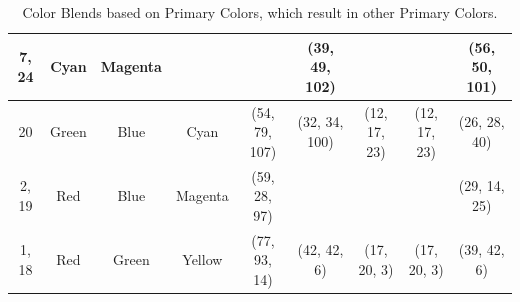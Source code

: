 \begin{table}[htbp]
{\begin{tabular}{ccccclclclclcl}
    \multicolumn{1}{c|}{7, 24}    & \multicolumn{1}{c|}{Cyan}    & \multicolumn{1}{c||}{Magenta} & \multicolumn{1}{c||}{\cellcolor[HTML]{0000FF}{\color[HTML]{FFFFFF} Blue}} & \multicolumn{2}{c||}{\cellcolor[HTML]{0000FF}{\color[HTML]{FFFFFF} (18, 7, 95)}} & \multicolumn{2}{c||}{\cellcolor[HTML]{00CAFF}(39, 49, 102)}                       & \multicolumn{2}{c||}{\cellcolor[HTML]{8080FF}{\color[HTML]{FFFFFF} (35, 27, 98)}} & \multicolumn{2}{c||}{\cellcolor[HTML]{8080FF}{\color[HTML]{FFFFFF} (35, 27, 98)}} & \multicolumn{2}{c|}{\cellcolor[HTML]{C6AEFF}(56, 50, 101)} \\ \hline \hline
    \multicolumn{1}{c|}{20}       & \multicolumn{1}{c|}{Green}   & \multicolumn{1}{c||}{Blue}    & \multicolumn{1}{c||}{\cellcolor[HTML]{00FFFF}Cyan}                        & \multicolumn{2}{c||}{\cellcolor[HTML]{00FFFF}(54, 79, 107)}                      & \multicolumn{2}{c||}{\cellcolor[HTML]{00A5FF}(32, 34, 100)}                       & \multicolumn{2}{c||}{\cellcolor[HTML]{008080}(12, 17, 23)}                        & \multicolumn{2}{c||}{\cellcolor[HTML]{008080}(12, 17, 23)}                        & \multicolumn{2}{c|}{\cellcolor[HTML]{7D93A6}(26, 28, 40)}  \\ \hline \hline
    \multicolumn{1}{c|}{2, 19}    & \multicolumn{1}{c|}{Red}     & \multicolumn{1}{c||}{Blue}    & \multicolumn{1}{c||}{\cellcolor[HTML]{FF00FF}Magenta}                     & \multicolumn{2}{c||}{\cellcolor[HTML]{FF00FF}(59, 28, 97)}                       & \multicolumn{2}{c||}{\cellcolor[HTML]{FB0080}{\color[HTML]{FFFFFF} (44, 22, 22)}} & \multicolumn{2}{c||}{\cellcolor[HTML]{800080}{\color[HTML]{FFFFFF} (13, 6, 21)}}  & \multicolumn{2}{c||}{\cellcolor[HTML]{800080}{\color[HTML]{FFFFFF} (13, 6, 21)}}  & \multicolumn{2}{c|}{\cellcolor[HTML]{CA0088}(29, 14, 25)}  \\ \hline \hline
    \multicolumn{1}{c|}{1, 18}    & \multicolumn{1}{c|}{Red}     & \multicolumn{1}{c||}{Green}   & \multicolumn{1}{c||}{\cellcolor[HTML]{FFFF00}Yellow}                      & \multicolumn{2}{c||}{\cellcolor[HTML]{FFFF00}(77, 93, 14)}                       & \multicolumn{2}{c||}{\cellcolor[HTML]{D7A700}(42, 42, 6)}                         & \multicolumn{2}{c||}{\cellcolor[HTML]{808000}(17, 20, 3)}                         & \multicolumn{2}{c||}{\cellcolor[HTML]{808000}(17, 20, 3)}                         & \multicolumn{2}{c|}{\cellcolor[HTML]{C9AB00}(39, 42, 6)}   \\ \hline
  \end{tabular}}
  \caption[Color Blends based on Primary Colors, which result in other Primary Colors.]{Color Blends based on Primary Colors, which result in other Primary Colors.}
  \vspace{-5pt}
  \label{table:primary_blends}
\end{table}
